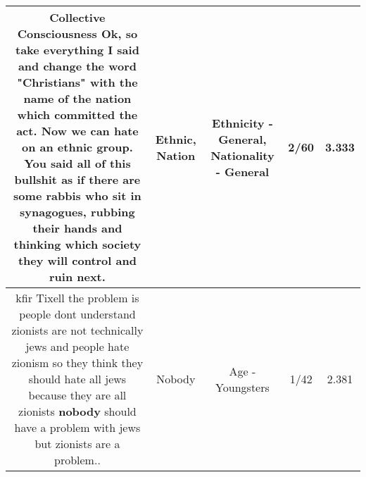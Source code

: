 \documentclass[11pt]{article}
\newlength\mylength
\begin{document}
\begin{center}
\begin{longtable}{|C{.65\mylength}|C{.30\mylength}|C{.12\mylength}|C{.12\mylength}|C{.12\mylength}|}
  \small Collective Consciousness Ok, so take everything I said and change the word "Christians" with the name of the \textbf{nation} which committed the act. Now we can hate on an \textbf{ethnic} group. You said all of this bullshit as if there are some rabbis who sit in synagogues, rubbing their hands and thinking which society they will control and ruin next.\normalsize   & Ethnic, Nation & Ethnicity - General, Nationality - General & 2/60 & 3.333 \\  \hline
  \small kfir Tixell the problem is people dont understand zionists are not technically jews and people hate zionism so they think they should hate all jews because they are all zionists  \textbf{nobody} should have a problem with jews but zionists are a problem..\normalsize   & Nobody & Age - Youngsters & 1/42 & 2.381 \\  \hline

\end{longtable}
\end{center}
\end{document}
